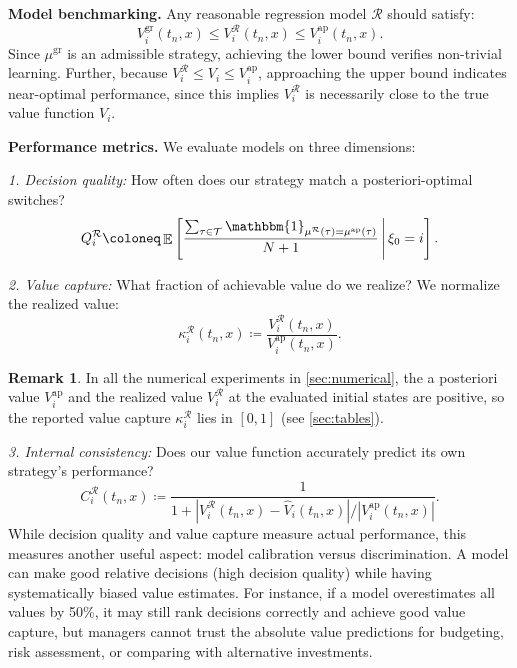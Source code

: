 \documentclass[11pt,reqno,a4paper]{amsart}
\theoremstyle{definition}
\newtheorem{remark}[theorem]{Remark}
\numberwithin{equation}{section}
\newcommand{\Mid}{\,\middle\vert \,}
\DeclareMathOperator{\E}{\mathbb{E}}
\DeclareMathOperator{\1}{\mathbbm{1}}
\begin{document}
\textbf{Model benchmarking.} Any reasonable regression model $\mathcal{R}$ should satisfy:
\begin{equation}
  V_i^{\text{gr}}(t_n,x) \leq V^{\mathcal{R}}_i(t_n,x) \leq V_i^{\text{ap}}(t_n,x).
\end{equation}
Since $\mu^{\text{gr}}$ is an admissible strategy, achieving the lower bound verifies non-trivial learning. Further, because $V_i^{\mathcal{R}} \leq V_i \leq V_i^{\text{ap}}$, approaching the upper bound indicates near-optimal performance, since this implies $V_i^{\mathcal{R}}$ is necessarily close to the true value function $V_i$.

\textbf{Performance metrics.} We evaluate models on three dimensions:

\emph{1. Decision quality:} How often does our strategy match a posteriori-optimal switches?
\begin{equation} \label{eq:decision_similarity}
  Q_i^\mathcal{R} \coloneq \E \left[  \frac{\sum_{\tau\in \mathcal{T}} \1_{\mu^{\mathcal{R}}(\tau) = \mu^{\text{ap}}(\tau)} }{N+1} \Mid \xi_0 = i\right].
\end{equation}

\emph{2. Value capture:} What fraction of achievable value do we realize? We normalize the realized value:
\begin{equation} \label{eq:normalized_value}
  \kappa_i^\mathcal{R}(t_n,x) \coloneq \frac{V^{\mathcal{R}}_i(t_n,x)}{V^{\text{ap}}_i(t_n,x)}.
\end{equation}
\begin{remark}
  In all the numerical experiments in \cref{sec:numerical}, the a posteriori value $V_i^{\text{ap}}$ and the realized value $V_i^{\mathcal{R}}$ at the evaluated initial states are positive, so the reported value capture $\kappa_i^{\mathcal{R}}$ lies in $[0,1]$ (see \cref{sec:tables}).
\end{remark}
\emph{3. Internal consistency:} Does our value function accurately predict its own strategy's performance?
\begin{equation} \label{eq:prediction_accuracy}
  C_i^\mathcal{R}(t_n,x) \coloneq \frac{1}{1+|V^{\mathcal{R}}_{i}(t_n,x)- \widehat{V}_i(t_n,x)|/|V^{\text{ap}}_i(t_n,x)|}.
\end{equation}
While decision quality and value capture measure actual performance, this measures another useful aspect: model calibration versus discrimination. A model can make good relative decisions (high decision quality) while having systematically biased value estimates. For instance, if a model overestimates all values by 50\%, it may still rank decisions correctly and achieve good value capture, but managers cannot trust the absolute value predictions for budgeting, risk assessment, or comparing with alternative investments.
\end{document}
